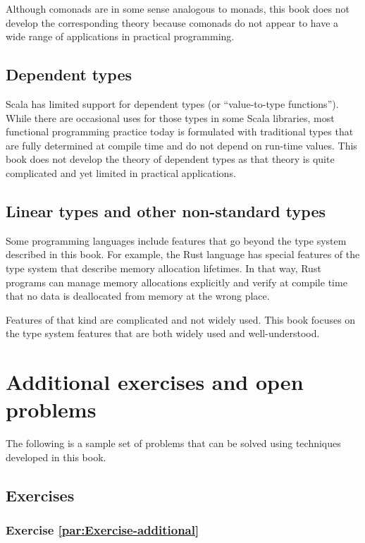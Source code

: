 Although comonads are in some sense analogous to monads, this book
does not develop the corresponding theory because comonads do not
appear to have a wide range of applications in practical programming.

\subsection{Dependent types}

Scala has limited support for dependent types
(or \textsf{``}value-to-type functions\textsf{''}). While there are occasional uses
for those types in some Scala libraries, most functional programming
practice today is formulated with traditional types that are fully
determined at compile time and do not depend on run-time values. This
book does not develop the theory of dependent types as that theory
is quite complicated and yet limited in practical applications.

\subsection{Linear types and other non-standard types}

Some programming languages include features that go beyond the type
system described in this book. For example, the Rust language has
special features of the type system that describe memory allocation
lifetimes. In that way, Rust programs can manage memory allocations
explicitly and verify at compile time that no data is deallocated
from memory at the wrong place.

Features of that kind are complicated and not widely used. This book
focuses on the type system features that are both widely used and
well-understood.

\section{Additional exercises and open problems\label{chap:Exercises-in-AFTT}}

The following is a sample set of problems that can be solved using
techniques developed in this book.

\subsection{Exercises}

\subsubsection{Exercise \label{par:Exercise-additional}\ref{par:Exercise-additional}}

